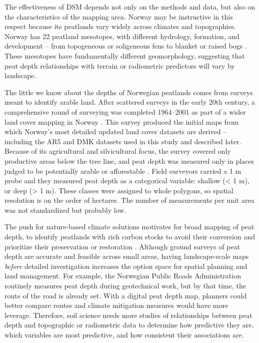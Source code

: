 \documentclass[soil, manuscript]{copernicus}
\begin{document}
The effectiveness of DSM depends not only on the methods and data, but also on the characteristics of the mapping area.
Norway may be instructive in this respect because its peatlands vary widely across climates and topographies.
Norway has 22 peatland mesotopes, with different hydrology, formation, and development -- from topogeneous or soligeneous fens to blanket or raised bogs \citep{joostenWiseUseMires2002, lyngstadBeskrivelserAvTorvmassivenheter2023}.
These mesotopes have fundamentally different geomorphology, suggesting that peat depth relationships with terrain or radiometric predictors will vary by landscape.

The little we know about the depths of Norwegian peatlands comes from surveys meant to identify arable land.
After scattered surveys in the early 20th century, a comprehensive round of surveying was completed 1964--2001 as part of a wider land cover mapping in Norway \citep{bjordalMarkslagsklassifikasjonOkonomiskKartverk2007}.
This survey produced the initial maps from which Norway's most detailed updated land cover datasets are derived -- including the AR5 and DMK datasets used in this study and described later.
Because of its agricultural and silvicultural focus, the survey covered only productive areas below the tree line, and peat depth was measured only in places judged to be potentially arable or afforestable \citep{ahlstromAR5Klassifikasjonssystem2019}.
Field surveyors carried a 1 m probe and they measured peat depth as a categorical variable: shallow (\textless{} 1 m), or deep (\textgreater{} 1 m).
These classes were assigned to whole polygons, so spatial resolution is on the order of hectares.
The number of measurements per unit area was not standardized but probably low.

The push for nature-based climate solutions motivates for broad mapping of peat depth, to identify peatlands with rich carbon stocks to avoid their conversion and prioritize their preservation or restoration \citep{strackPotentialPeatlandsNatureBased2022}.
Although ground surveys of peat depth are accurate and feasible across small areas, having landscape-scale maps \emph{before} detailed investigation increases the option space for spatial planning and land management.
For example, the Norwegian Public Roads Administration routinely measures peat depth during geotechnical work, but by that time, the route of the road is already set.
With a digital peat depth map, planners could better compare routes and climate mitigation measures would have more leverage.
Therefore, soil science needs more studies of relationships between peat depth and topographic or radiometric data to determine how predictive they are, which variables are most predictive, and how consistent their associations are.
\end{document}
